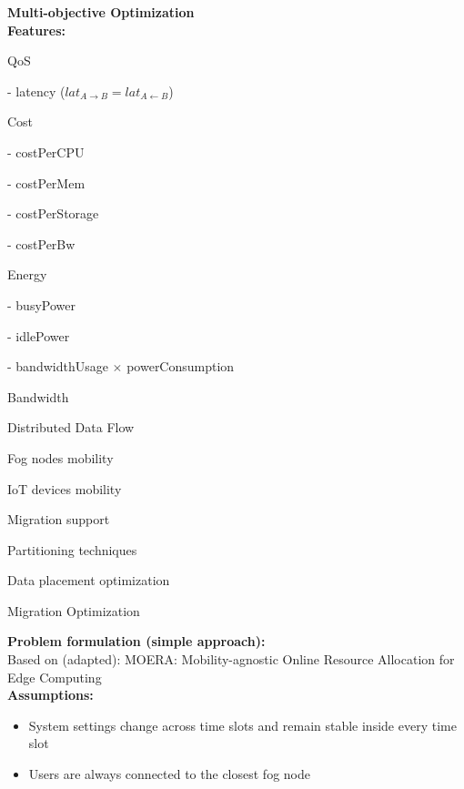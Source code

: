 \documentclass{article}
\begin{document}
\newcommand{\SubItem}[1]{
    {\setlength\itemindent{15pt} \item[-] #1}
}

\noindent\textbf{Multi-objective Optimization}\\[12pt]

\noindent\textbf{Features:}\\[6pt]
\begin{itemize}
\item QoS
    \SubItem{latency ($lat_{A \rightarrow B} = lat_{A \leftarrow B}$)}
\item Cost
    \SubItem{costPerCPU}
    \SubItem{costPerMem}
    \SubItem{costPerStorage}
    \SubItem{costPerBw}
\item Energy
    \SubItem{busyPower}
    \SubItem{idlePower}
    \SubItem{bandwidthUsage $\times$ powerConsumption}
\item Bandwidth\\[12pt]
    
\item Distributed Data Flow
\item Fog nodes mobility
\item IoT devices mobility
\item Migration support
\item Partitioning techniques
\item Data placement optimization
\item Migration Optimization
\end{itemize}
\pagebreak

\noindent\textbf{Problem formulation (simple approach):}\\[6pt]
Based on (adapted): MOERA: Mobility-agnostic Online Resource Allocation for Edge Computing\\[12pt]
\noindent\textbf{Assumptions:}\\[6pt]
\begin{itemize}
    \item System settings change across time slots and remain stable inside every time slot
    \item Users are always connected to the closest fog node
\end{itemize}
\end{document}
